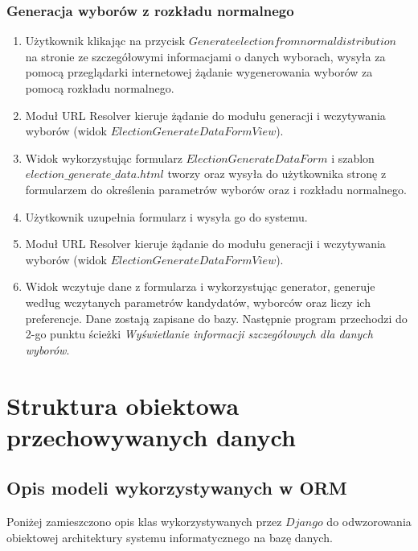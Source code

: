 \documentclass[pdflatex,11pt]{../aghdoc_version2}
\begin{document}
\subsection{Generacja wyborów z rozkładu normalnego}
\begin{enumerate}
\item Użytkownik klikając na przycisk $Generate election from normal distribution$ na stronie
ze szczegółowymi informacjami o danych wyborach, wysyła za pomocą przeglądarki
internetowej żądanie wygenerowania wyborów za pomocą rozkładu normalnego.
\item Moduł URL Resolver kieruje żądanie do modułu generacji i wczytywania wyborów (widok
$ElectionGenerateDataFormView$).
\item Widok wykorzystując formularz $ElectionGenerateDataForm$ i szablon
$election\_generate\_data.html$ tworzy oraz wysyła do użytkownika stronę z formularzem do
określenia parametrów wyborów oraz i rozkładu normalnego.  
\item Użytkownik uzupełnia formularz i wysyła go do systemu.
\item Moduł URL Resolver kieruje żądanie do modułu generacji i wczytywania wyborów (widok
$ElectionGenerateDataFormView$).
\item Widok wczytuje dane z formularza i wykorzystując generator, generuje według
wczytanych parametrów kandydatów, wyborców oraz liczy ich preferencje. Dane
zostają zapisane do bazy. Następnie program przechodzi do 2-go punktu ścieżki
\textit{Wyświetlanie informacji szczegółowych dla danych wyborów}.
\end{enumerate}

\chapter{Struktura obiektowa przechowywanych danych}
\section{Opis modeli wykorzystywanych w ORM}
Poniżej zamieszczono opis klas wykorzystywanych przez $Django$ do odwzorowania
obiektowej architektury systemu informatycznego na bazę danych.
\end{document}
